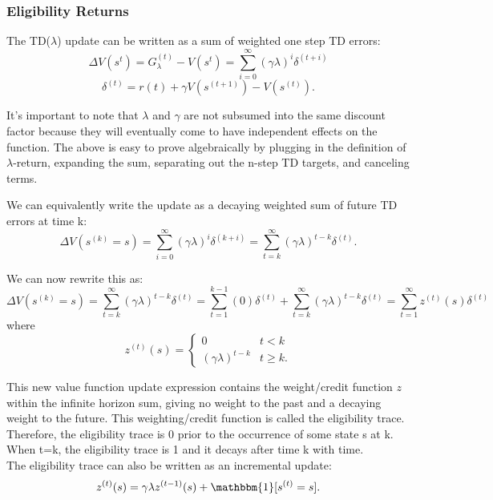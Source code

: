 \documentclass[11pt]{article}
\begin{document}
\subsubsection{Eligibility Returns}
The TD($\lambda$) update can be written as a sum of weighted one step TD errors:
\begin{equation}
    \Delta V(s^t) = G_\lambda^{(t)} - V(s^t) = \sum_{i=0}^\infty(\gamma \lambda)^i \delta^{(t+i)}
\end{equation}
\begin{equation}
    \delta^{(t)} = r{(t)}+ \gamma V(s^{(t+1)}) - V(s^{(t)}).
\end{equation}

It's important to note that $\lambda$ and $\gamma$ are not subsumed into the same discount factor because they will eventually come to have independent effects on the function. The above is easy to prove algebraically by plugging in the definition of $\lambda$-return, expanding the sum, separating out the n-step TD targets, and canceling terms. 

We can equivalently write the update as a decaying weighted sum of future TD errors at time k:
\begin{equation}
    \Delta V(s^{(k)} = s) = \sum_{i=0}^\infty(\gamma \lambda)^i \delta^{(k+i)} = \sum_{t=k}^\infty(\gamma \lambda)^{t-k} \delta^{(t)}.
\end{equation}

We can now rewrite this as:
\begin{equation}
    \Delta V(s^{(k)} = s) = \sum_{t=k}^\infty(\gamma \lambda)^{t-k} \delta^{(t)} = \sum_{t=1}^{k-1}(0)\delta^{(t)} + \sum_{t=k}^\infty(\gamma \lambda)^{t-k} \delta^{(t)} = \sum_{t=1}^\infty z^{(t)}(s) \delta^{(t)}
\end{equation}
where 
\begin{equation}
z^{(t)}(s) = \begin{cases}
    0 & t<k \\
    (\gamma \lambda)^{t-k} & t \geq k.
    \end{cases}
\end{equation}

This new value function update expression contains the weight/credit function $z$ within the infinite horizon sum, giving no weight to the past and a decaying weight to the future. This weighting/credit function is called the eligibility trace. \\
Therefore, the eligibility trace is 0 prior to the occurrence of some state s at k. When t=k, the eligibility trace is 1 and it decays after time k with time.\\
The eligibility trace can also be written as an incremental update:
\begin{equation}
    z^{(t)}(s) = \gamma \lambda z^{(t-1)}(s) + \mathbbm{1}[s^{(t)}=s].
\end{equation}
\end{document}

